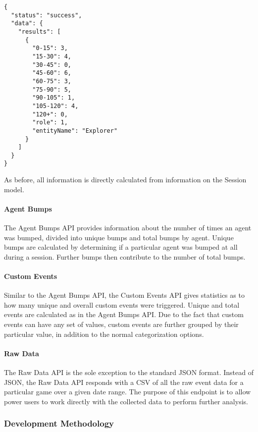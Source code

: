 \medskip
\begin{lstlisting}[caption=Gameplay Duration API response{,} showing the number of sessions that fell within certain ranges of gameplay time{,} categorized by the Explorer role, label={lst:duration_response}]
{
  "status": "success",
  "data": {
    "results": [
      {
        "0-15": 3,
        "15-30": 4,
        "30-45": 0,
        "45-60": 6,
        "60-75": 3,
        "75-90": 5,
        "90-105": 1,
        "105-120": 4,
        "120+": 0,
        "role": 1,
        "entityName": "Explorer"
      }
    ]
  }
}
\end{lstlisting}

As before, all information is directly calculated from information on the Session model.

\paragraph{Agent Bumps}

The Agent Bumps API provides information about the number of times an agent was bumped, divided into unique bumps and total bumps by agent. Unique bumps are calculated by determining if a particular agent was bumped at all during a session. Further bumps then contribute to the number of total bumps. 

\paragraph{Custom Events}

Similar to the Agent Bumps API, the Custom Events API gives statistics as to how many unique and overall custom events were triggered. Unique and total events are calculated as in the Agent Bumps API. Due to the fact that custom events can have any set of values, custom events are further grouped by their particular value, in addition to the normal categorization options.

\paragraph{Raw Data}

The Raw Data API is the sole exception to the standard JSON format. Instead of JSON, the Raw Data API responds with a CSV of all the raw event data for a particular game over a given date range. The purpose of this endpoint is to allow power users to work directly with the collected data to perform further analysis.


\subsubsection{Development Methodology}

